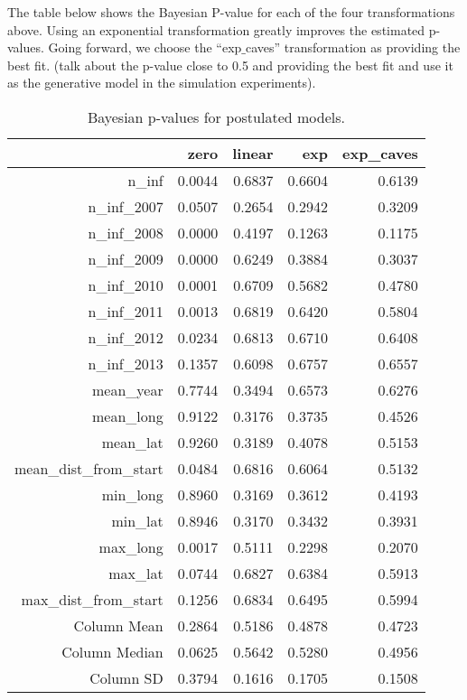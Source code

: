 \documentclass[11pt]{article}
\begin{document}
The table below shows the Bayesian P-value for each of the four
transformations above.  Using an exponential transformation greatly
improves the estimated p-values.  Going forward, we choose the
``exp\(\_\)caves'' transformation as providing the best fit.  (talk
about the p-value close to 0.5 and providing the best fit and use
it as the generative model in the simulation experiments).

\begin{table}[ht]
\centering
\begin{tabular}{rrrrr}
  & zero & linear & exp & exp\_caves \\ 
  \hline
n\_inf & 0.0044 & 0.6837 & 0.6604 & 0.6139 \\ 
  n\_inf\_2007 & 0.0507 & 0.2654 & 0.2942 & 0.3209 \\ 
  n\_inf\_2008 & 0.0000 & 0.4197 & 0.1263 & 0.1175 \\ 
  n\_inf\_2009 & 0.0000 & 0.6249 & 0.3884 & 0.3037 \\ 
  n\_inf\_2010 & 0.0001 & 0.6709 & 0.5682 & 0.4780 \\ 
  n\_inf\_2011 & 0.0013 & 0.6819 & 0.6420 & 0.5804 \\ 
  n\_inf\_2012 & 0.0234 & 0.6813 & 0.6710 & 0.6408 \\ 
  n\_inf\_2013 & 0.1357 & 0.6098 & 0.6757 & 0.6557 \\ 
  mean\_year & 0.7744 & 0.3494 & 0.6573 & 0.6276 \\ 
  mean\_long & 0.9122 & 0.3176 & 0.3735 & 0.4526 \\ 
  mean\_lat & 0.9260 & 0.3189 & 0.4078 & 0.5153 \\ 
  mean\_dist\_from\_start & 0.0484 & 0.6816 & 0.6064 & 0.5132 \\ 
  min\_long & 0.8960 & 0.3169 & 0.3612 & 0.4193 \\ 
  min\_lat & 0.8946 & 0.3170 & 0.3432 & 0.3931 \\ 
  max\_long & 0.0017 & 0.5111 & 0.2298 & 0.2070 \\ 
  max\_lat & 0.0744 & 0.6827 & 0.6384 & 0.5913 \\ 
  max\_dist\_from\_start & 0.1256 & 0.6834 & 0.6495 & 0.5994 \\ 
   \hline
Column Mean & 0.2864 & 0.5186 & 0.4878 & 0.4723 \\ 
  Column Median & 0.0625 & 0.5642 & 0.5280 & 0.4956 \\ 
  Column SD & 0.3794 & 0.1616 & 0.1705 & 0.1508 \\ 
   \hline
\end{tabular}
\caption{Bayesian p-values for postulated models.} 
\end{table}
\end{document}
